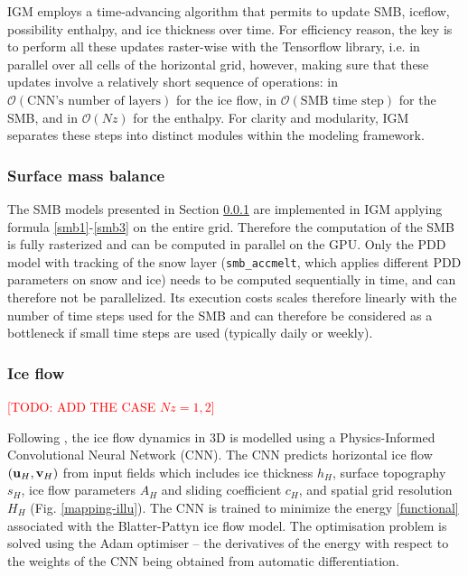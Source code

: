 \documentclass[gmd]{copernicus}
\begin{document}
IGM employs a time-advancing algorithm that permits to update SMB, iceflow,  possibility enthalpy, and ice thickness over time. For efficiency reason, the key is to perform all these updates raster-wise with the Tensorflow library, i.e. in parallel over all cells of the horizontal grid, however, making sure that these updates involve a relatively short sequence of operations: in $\mathcal{O}(\textrm{CNN's number of layers})$ for the ice flow, in $\mathcal{O}(\textrm{SMB time step})$ for the SMB, and in $\mathcal{O}(Nz)$ for the enthalpy.
For clarity and modularity, IGM separates these steps into distinct modules within the modeling framework.

\subsubsection{Surface mass balance}
\label{num_smb}

The SMB models presented in Section \ref{num_smb} are implemented in IGM applying formula \eqref{smb1}-\eqref{smb3} on the entire grid. Therefore the computation of the SMB is fully rasterized and can be computed in parallel on the GPU. Only the PDD model with tracking of the snow layer (\texttt{smb\_accmelt}, which applies different PDD parameters on snow and ice) needs to be computed sequentially in time, and can therefore not be parallelized. Its execution costs scales therefore linearly with the number of time steps used for the SMB and can therefore be considered as a bottleneck if small time steps are used (typically daily or weekly).
 
\subsubsection{Ice flow}
\label{num_iceflow}

\textcolor{red}{[TODO: ADD THE CASE $Nz=1,2$]}

Following \citet{jouvet2023ice}, the ice flow dynamics in 3D is modelled using a Physics-Informed Convolutional Neural Network (CNN). The CNN predicts horizontal ice flow $({\bf u}_H, {\bf v}_H)$ from input fields which includes ice thickness $h_H$, surface topography $s_H$, ice flow parameters $A_H$ and sliding coefficient $c_H$, and spatial grid resolution $H_H$ (Fig. \ref{mapping-illu}). The CNN is trained to minimize the energy \eqref{functional} associated with the Blatter-Pattyn ice flow model. The optimisation problem is solved using the Adam optimiser \citep{kingma2014adam} -- the derivatives of the energy with respect to the weights of the CNN being obtained from automatic differentiation.
\end{document}
